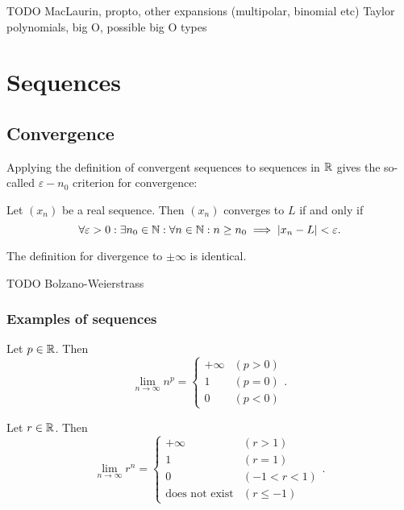 TODO MacLaurin, propto, other expansions (multipolar, binomial etc) 
Taylor polynomials, big O, possible big O types

\section{Sequences}
\subsection{Convergence}
Applying the definition of convergent sequences to sequences in $\mathbb{R}$ gives the so-called $\varepsilon-n_0$ criterion for convergence:
\begin{proposition}
Let $(x_n)$ be a real sequence. Then $(x_n)$ converges to $L$ \textup{if and only if}
\[ \forall \varepsilon> 0: \exists n_0\in\mathbb{N}: \forall n\in\mathbb{N}: n\geq n_0 \implies |x_n-L|<\varepsilon. \]
\end{proposition}
The definition for divergence to $\pm\infty$ is identical.

TODO Bolzano-Weierstrass

\subsubsection{Examples of sequences}
\begin{proposition}
Let $p\in\mathbb{R}$. Then
\[ \lim_{n\to\infty} n^p = \begin{cases}
+\infty & (p>0) \\
1 & (p=0) \\
0 & (p<0)
\end{cases}. \]
\end{proposition}

\begin{proposition}
Let $r\in\mathbb{R}$. Then
\[ \lim_{n\to\infty} r^n = \begin{cases}
+\infty & (r>1) \\
1 & (r=1) \\
0 & (-1<r<1) \\
\text{does not exist} & (r\leq -1)
\end{cases}. \]
\end{proposition}

